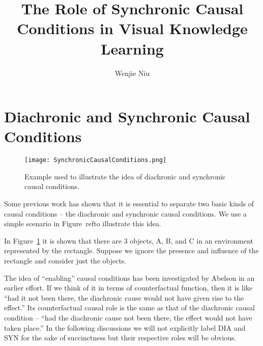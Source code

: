 \documentclass{article}
\author{Wenjie Niu}
\title{The Role of Synchronic Causal Conditions in Visual Knowledge Learning}
\begin{document}
 
\twocolumn
\maketitle
\section{Diachronic and Synchronic Causal Conditions}
\begin{figure}[H]
\centering
 \texttt{[image: SynchronicCausalConditions.png]} 
 \caption{Example used to illustrate the idea of diachronic and
synchronic causal conditions.}  
 \label{fig:Conditions}
 \end{figure}
\cite{Ho_2017_CVPR_Workshops}Some previous work has shown that it is essential to separate two basic kinds of causal conditions – the diachronic and synchronic causal conditions. We use a simple scenario in Figure~ref{}to illustrate this idea. \par
In Figure~\ref{fig:Conditions} it is shown that there are 3 objects, A, B, and C in an environment represented by the rectangle. Suppose we ignore the presence and influence of the rectangle and consider just the objects. \par
The idea of “enabling” causal
conditions has been investigated by Abelson in an earlier effort. If we think of it in terms of counterfactual function, then it is like “had it not been there, the diachronic cause would not have given rise to the effect.” Its counterfactual causal role is the same as that of the diachronic causal condition – “had the diachronic cause not been there, the effect would not have taken place.” In the following discussions we will not explicitly label DIA and SYN for the sake of succinctness but their respective
roles will be obvious.\par
 

\end{document}
